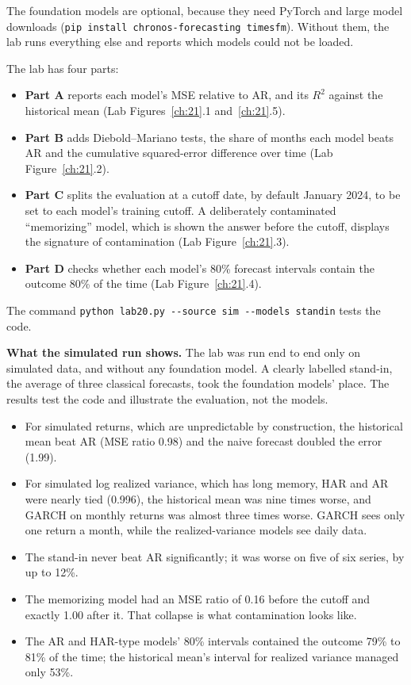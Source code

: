 The foundation models are optional, because they need PyTorch and large model downloads (\texttt{pip install chronos-forecasting timesfm}). Without them, the lab runs everything else and reports which models could not be loaded.

The lab has four parts:

\begin{itemize}
  \item \textbf{Part A} reports each model's MSE relative to AR, and its $R^2$ against the historical mean (Lab Figures~\ref{ch:21}.1 and~\ref{ch:21}.5).
  \item \textbf{Part B} adds Diebold--Mariano tests, the share of months each model beats AR and the cumulative squared-error difference over time (Lab Figure~\ref{ch:21}.2).
  \item \textbf{Part C} splits the evaluation at a cutoff date, by default January 2024, to be set to each model's training cutoff. A deliberately contaminated ``memorizing'' model, which is shown the answer before the cutoff, displays the signature of contamination (Lab Figure~\ref{ch:21}.3).
  \item \textbf{Part D} checks whether each model's 80\% forecast intervals contain the outcome 80\% of the time (Lab Figure~\ref{ch:21}.4).
\end{itemize}

The command \texttt{python lab20.py -{}-source sim -{}-models standin} tests the code.

\textbf{What the simulated run shows.} The lab was run end to end only on simulated data, and without any foundation model. A clearly labelled stand-in, the average of three classical forecasts, took the foundation models' place. The results test the code and illustrate the evaluation, not the models.

\begin{itemize}
  \item For simulated returns, which are unpredictable by construction, the historical mean beat AR (MSE ratio 0.98) and the naive forecast doubled the error (1.99).
  \item For simulated log realized variance, which has long memory, HAR and AR were nearly tied (0.996), the historical mean was nine times worse, and GARCH on monthly returns was almost three times worse. GARCH sees only one return a month, while the realized-variance models see daily data.
  \item The stand-in never beat AR significantly; it was worse on five of six series, by up to 12\%.
  \item The memorizing model had an MSE ratio of 0.16 before the cutoff and exactly 1.00 after it. That collapse is what contamination looks like.
  \item The AR and HAR-type models' 80\% intervals contained the outcome 79\% to 81\% of the time; the historical mean's interval for realized variance managed only 53\%.
\end{itemize}

